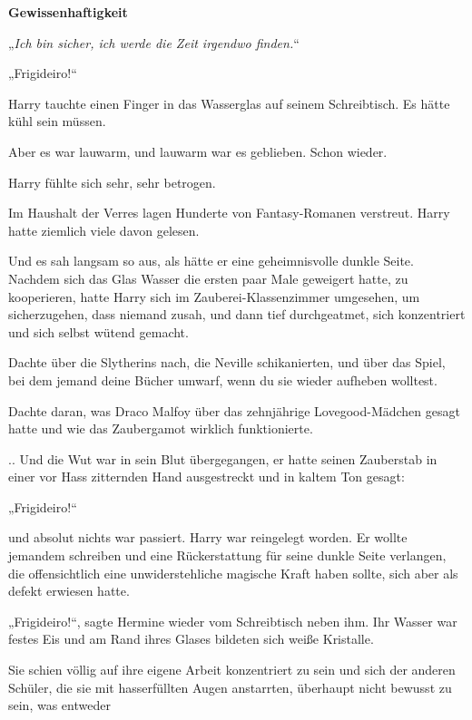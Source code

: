 

\hypertarget{gewissenhaftigkeit}{%

\textbf{Gewissenhaftigkeit}

„\emph{Ich bin sicher, ich werde die Zeit irgendwo finden.}“

„Frigideiro!“

Harry tauchte einen Finger in das Wasserglas auf seinem Schreibtisch. Es hätte kühl sein müssen.

Aber es war lauwarm, und lauwarm war es geblieben. Schon wieder.

Harry fühlte sich sehr, sehr betrogen.

Im Haushalt der Verres lagen Hunderte von Fantasy-Romanen verstreut. Harry hatte ziemlich viele davon gelesen.

Und es sah langsam so aus, als hätte er eine geheimnisvolle dunkle Seite. Nachdem sich das Glas Wasser die ersten paar Male geweigert hatte, zu kooperieren, hatte Harry sich im Zauberei-Klassenzimmer umgesehen, um sicherzugehen, dass niemand zusah, und dann tief durchgeatmet, sich konzentriert und sich selbst wütend gemacht.

Dachte über die Slytherins nach, die Neville schikanierten, und über das Spiel, bei dem jemand deine Bücher umwarf, wenn du sie wieder aufheben wolltest.

Dachte daran, was Draco Malfoy über das zehnjährige Lovegood-Mädchen gesagt hatte und wie das Zaubergamot wirklich funktionierte.

.. Und die Wut war in sein Blut übergegangen, er hatte seinen Zauberstab in einer vor Hass zitternden Hand ausgestreckt und in kaltem Ton gesagt:

„Frigideiro!“

und absolut nichts war passiert. Harry war reingelegt worden. Er wollte jemandem schreiben und eine Rückerstattung für seine dunkle Seite verlangen, die offensichtlich eine unwiderstehliche magische Kraft haben sollte, sich aber als defekt erwiesen hatte.

„Frigideiro!“, sagte Hermine wieder vom Schreibtisch neben ihm. Ihr Wasser war festes Eis und am Rand ihres Glases bildeten sich weiße Kristalle.

Sie schien völlig auf ihre eigene Arbeit konzentriert zu sein und sich der anderen Schüler, die sie mit hasserfüllten Augen anstarrten, überhaupt nicht bewusst zu sein, was entweder

}
